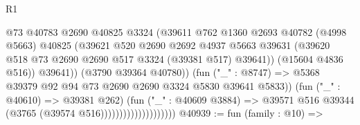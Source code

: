 \begin{lexlean}{R1}
\begin{coremodule}
                                              @73
                                              @40783
                                              @2690
                                              @40825
                                              @3324
                                              (@39611
                                                @762
                                                @1360
                                                @2693
                                                @40782
                                                (@4998 @5663)
                                                @40825
                                                (@39621
                                                  @520
                                                  @2690
                                                  @2692
                                                  @4937
                                                  @5663
                                                  @39631
                                                  (@39620
                                                    @518
                                                    @73
                                                    @2690
                                                    @2690
                                                    @517
                                                    @3324
                                                    (@39381 @517)
                                                    @39641))
                                                (@15604 @4836 @516))
                                              @39641))
                                          (@3790 @39364 @40780))
                                        (fun ("_" : @8747) =>
                                        @5368
                                          @39379
                                          @92
                                          @94
                                          @73
                                          @2690
                                          @2690
                                          @3324
                                          @5830
                                          @39641
                                          @5833))
                                      (fun ("_" : @40610) => @39381 @262)
                                      (fun ("_" : @40609 @3884) =>
                                      @39571 @516 @39344 (@3765 (@39574 @516))))))))))))))))))))
@40939 := fun (family : @10) =>

\end{coremodule}
\end{lexlean}
